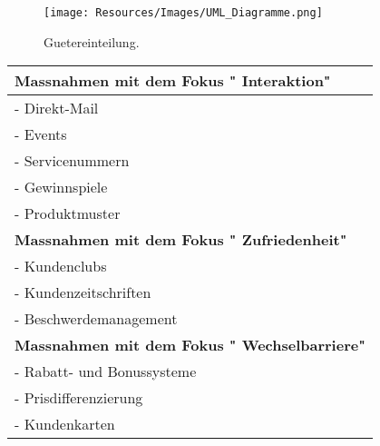 \documentclass{article}
\title{}
\author{Asha Schwegler}
\begin{document}
\maketitle
\tableofcontents
\newpage



\begin{figure}[H]
\centering
\texttt{[image: Resources/Images/UML\_Diagramme.png]}
\caption{\label{fig:Guetereinteilung}Guetereinteilung.}
\end{figure}


\begin{table} [H]

\begin{tabular}{l}

\colorbox{pink!30}{\textbf{Massnahmen mit dem Fokus " Interaktion"} }

\\\hline
- Direkt-Mail\\
- Events\\
- Servicenummern\\
- Gewinnspiele\\
- Produktmuster\\
\hline
\colorbox{pink!30}{\textbf{Massnahmen mit dem Fokus " Zufriedenheit"}}\\
\hline
- Kundenclubs\\
- Kundenzeitschriften\\
- Beschwerdemanagement\\
\hline
\colorbox{pink!30}{\textbf{Massnahmen mit dem Fokus " Wechselbarriere"}}\\
\hline
- Rabatt- und Bonussysteme\\
- Prisdifferenzierung\\
- Kundenkarten\\
\end{tabular}
\end{table}
\end{document}
